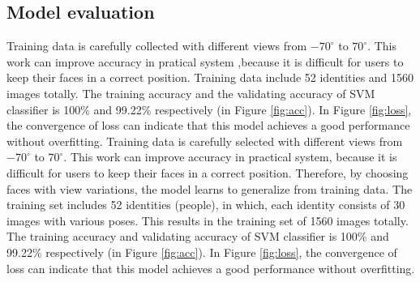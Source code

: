 \documentclass[journal, twocolumn]{IEEEtran}
\begin{document}
\subsection{Model evaluation}
Training data is carefully collected with different views from $-70^\circ$ to $70^\circ$. This work can improve accuracy in pratical system ,because it is difficult for users to keep their faces in a correct position. Training data include 52 identities and 1560 images totally. The training accuracy and the validating accuracy of SVM classifier is 100\% and 99.22\% respectively (in Figure \ref{fig:acc}). In Figure \ref{fig:loss}, the convergence of loss can indicate that this model achieves a good performance without overfitting. 
Training data is carefully selected with different views from $-70^\circ$ to $70^\circ$. This work can improve accuracy in practical system, because it is difficult for users to keep their faces in a correct position. Therefore, by choosing faces with view variations, the model learns to generalize from training data. The training set includes 52 identities (people), in which, each identity consists of 30 images with various poses. This results in the training set of 1560 images totally. The training accuracy and validating accuracy of SVM classifier is 100\% and 99.22\% respectively (in Figure \ref{fig:acc}). In Figure \ref{fig:loss}, the convergence of loss can indicate that this model achieves a good performance without overfitting.
\end{document}
